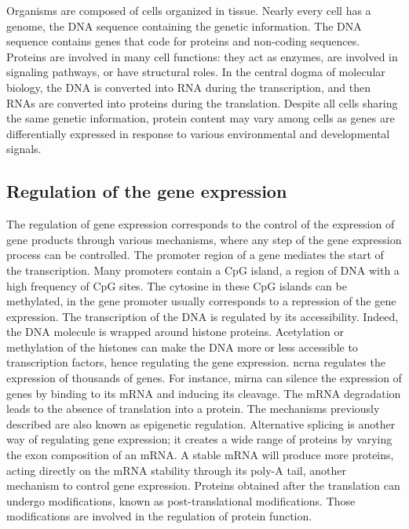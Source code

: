 \documentclass[../main.tex]{subfiles}
\begin{document}
	Organisms are composed of cells organized in tissue.
	Nearly every cell has a genome, the DNA sequence containing the genetic information.
	The DNA sequence contains genes that code for proteins and non-coding sequences.
	Proteins are involved in many cell functions: they act as enzymes, are involved in signaling pathways, or have structural roles.
	In the central dogma of molecular biology, the DNA is converted into RNA  during the transcription, and then RNAs are converted into proteins during the translation.
	Despite all cells sharing the same genetic information, protein content may vary among cells as genes are differentially expressed in response to various environmental and developmental signals.

	\subsection{Regulation of the gene expression}\label{subsec:gene_regulation}
		The regulation of gene expression corresponds to the control of the expression of gene products through various mechanisms,
		where any step of the gene expression process can be controlled.
		The promoter region of a gene mediates the start of the transcription.
		Many promoters contain a CpG island, a region of DNA with a high frequency of CpG sites.
		The cytosine in these CpG islands can be methylated,  in the gene promoter usually corresponds to a repression of the gene expression.
		The transcription of the DNA is regulated by its accessibility.
		Indeed, the DNA molecule is wrapped around histone proteins.
		Acetylation or methylation of the histones can make the DNA more or less accessible to transcription factors, hence regulating the gene expression.
		\Gls{ncrna} regulates the expression of thousands of genes.
		For instance, \gls{mirna} can silence the expression of genes by binding to its mRNA and inducing its cleavage.
		The mRNA degradation leads to the absence of translation into a protein.
		The mechanisms previously described are also known as epigenetic regulation.
		Alternative splicing is another way of regulating gene expression; it creates a wide range of proteins by varying the exon composition of an mRNA\@.
		A stable mRNA will produce more proteins, acting directly on the mRNA stability through its poly-A tail, another mechanism to control gene expression.
		Proteins obtained after the translation can undergo modifications, known as post-translational modifications.
		Those modifications are involved in the regulation of protein function.
\end{document}
